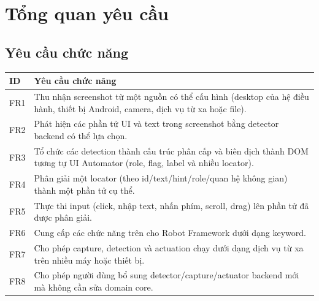 \documentclass[11pt,a4paper]{report}
\begin{document}
\section{Tổng quan yêu cầu}
\subsection*{Yêu cầu chức năng}
\begin{longtable}{@{}p{1.6cm}p{12.6cm}@{}}
\toprule
\textbf{ID} & \textbf{Yêu cầu chức năng} \\
\midrule
\endhead
FR1 & Thu nhận screenshot từ một nguồn có thể cấu hình (desktop của hệ điều hành, thiết bị Android, camera, dịch vụ từ xa hoặc file). \\
FR2 & Phát hiện các phần tử UI và text trong screenshot bằng detector backend có thể lựa chọn. \\
FR3 & Tổ chức các detection thành cấu trúc phân cấp và biên dịch thành DOM tương tự UI Automator (role, flag, label và nhiều locator). \\
FR4 & Phân giải một locator (theo id/text/hint/role/quan hệ không gian) thành một phần tử cụ thể. \\
FR5 & Thực thi input (click, nhập text, nhấn phím, scroll, drag) lên phần tử đã được phân giải. \\
FR6 & Cung cấp các chức năng trên cho Robot Framework dưới dạng keyword. \\
FR7 & Cho phép capture, detection và actuation chạy dưới dạng dịch vụ từ xa trên nhiều máy hoặc thiết bị. \\
FR8 & Cho phép người dùng bổ sung detector/capture/actuator backend mới mà không cần sửa domain core. \\
\bottomrule
\end{longtable}
\end{document}
